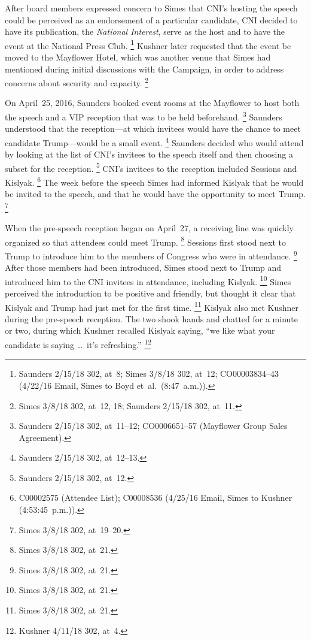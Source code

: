 After board members expressed concern to Simes that CNI's hosting the speech could be perceived as an endorsement of a particular candidate, CNI decided to have its publication, the \textit{National Interest}, serve as the host and to have the event at the National Press Club.%
\footnote{Saunders 2/15/18 302, at~8;
Simes 3/8/18 302, at~12;
CO00003834--43 (4/22/16 Email, Simes to Boyd et~al.\ (8:47~a.m.)).}
Kushner later requested that the event be moved to the Mayflower Hotel, which was another venue that Simes had mentioned during initial discussions with the Campaign, in order to address concerns about security and capacity.%
\footnote{Simes 3/8/18 302, at~12, 18;
Saunders 2/15/18 302, at~11.}

On April~25, 2016, Saunders booked event rooms at the Mayflower to host both the speech and a VIP reception that was to be held beforehand.%
\footnote{Saunders 2/15/18 302, at~11--12;
CO0006651--57 (Mayflower Group Sales Agreement).}
Saunders understood that the reception---at which invitees would have the chance to meet candidate Trump---would be a small event.%
\footnote{Saunders 2/15/18 302, at~12--13.}
Saunders decided who would attend by looking at the list of CNI's invitees to the speech itself and then choosing a subset for the reception.%
\footnote{Saunders 2/15/18 302, at~12.}
CNI's invitees to the reception included Sessions and Kislyak.%
\footnote{C00002575 (Attendee List);
C00008536 (4/25/16 Email, Simes to Kushner (4:53:45~p.m.)).}
The week before the speech Simes had informed Kislyak that he would be invited to the speech, and that he would have the opportunity to meet Trump.%
\footnote{Simes 3/8/18 302, at~19--20.}

When the pre-speech reception began on April~27, a receiving line was quickly organized so that attendees could meet Trump.%
\footnote{Simes 3/8/18 302, at~21.}
Sessions first stood next to Trump to introduce him to the members of Congress who were in attendance.%
\footnote{Simes 3/8/18 302, at~21.}
After those members had been introduced, Simes stood next to Trump and introduced him to the CNI invitees in attendance, including Kislyak.%
\footnote{Simes 3/8/18 302, at~21.}
Simes perceived the introduction to be positive and friendly, but thought it clear that Kislyak and Trump had just met for the first time.%
\footnote{Simes 3/8/18 302, at~21.}
Kislyak also met Kushner during the pre-speech reception.
The two shook hands and chatted for a minute or two, during which Kushner recalled Kislyak saying, ``we like what your candidate is saying \dots\ it's refreshing.''%
\footnote{Kushner 4/11/18 302, at~4.}


